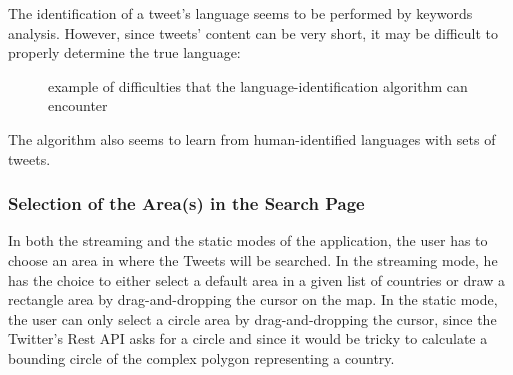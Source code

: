 \documentclass[a4paper,11pt]{report}
\begin{document}
The identification of a tweet's language\cite{MitjaTrampus2015} seems to be performed by keywords analysis. However, since tweets' content can be very short, it may be difficult to properly determine the true language:
\begin{figure}[H]
\vspace{-5pt}
\begin{center}
\vspace{-20pt}
\caption{example of difficulties that the language-identification algorithm can encounter\cite{MitjaTrampus2015}}
\end{center}
\end{figure}

The algorithm also seems to learn from human-identified languages with sets of tweets.

\subsubsection{Selection of the Area(s) in the Search Page}
In both the streaming and the static modes of the application, the user has to choose an area in where the Tweets will be searched. In the streaming mode, he has the choice to either select a default area in a given list of countries or draw a rectangle area by drag-and-dropping the cursor on the map. In the static mode, the user can only select a circle area by drag-and-dropping the cursor, since the Twitter's Rest API asks for a circle and since it would be tricky to calculate a bounding circle of the complex polygon representing a country.\\
\end{document}
